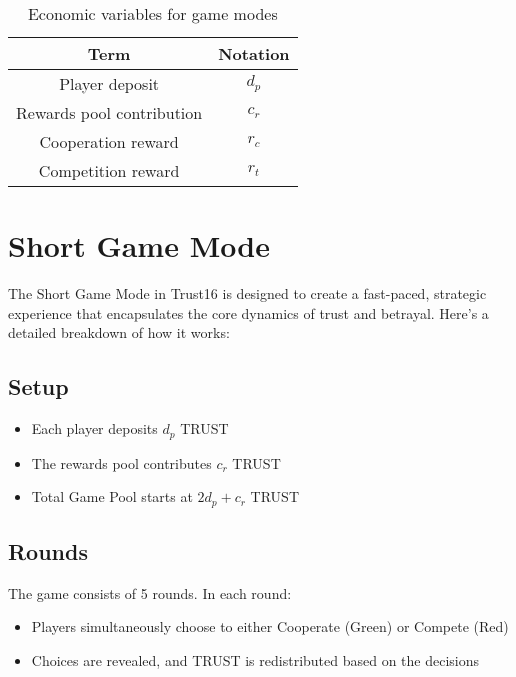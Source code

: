 \documentclass[table, twocolumn]{article}
\begin{document}
\begin{table}[!htb]
  \centering
  \begin{tabular}{|c|c|}
    \hline \rowcolor{gray!20}
    Term                                   & Notation \\ \hline
    Player deposit                         & $d_p$    \\ \hline
    Rewards pool contribution              & $c_r$    \\ \hline
    Cooperation reward                     & $r_c$    \\ \hline
    Competition reward                     & $r_t$    \\ \hline
  \end{tabular}
  \caption{Economic variables for game modes}
  \label{tab:game-model-variables}
\end{table}

\section{Short Game Mode} \label{sec:short-game-mode}

The Short Game Mode in Trust16 is designed to create a fast-paced, strategic experience
that encapsulates the core dynamics of trust and betrayal. Here's a detailed breakdown
of how it works:

\subsection{Setup}
\begin{itemize}
    \item Each player deposits $d_p$ TRUST
    \item The rewards pool contributes $c_r$ TRUST
    \item Total Game Pool starts at $2d_p + c_r$ TRUST
\end{itemize}

\subsection{Rounds}
The game consists of 5 rounds. In each round:
\begin{itemize}
    \item Players simultaneously choose to either Cooperate (Green) or Compete (Red)
    \item Choices are revealed, and TRUST is redistributed based on the decisions
\end{itemize}
\end{document}
